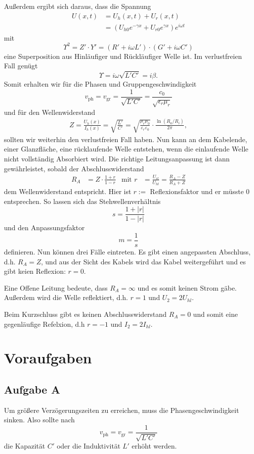 \documentclass[10pt]{article}
\begin{document}
\begin{multicols}{2}
	Außerdem ergibt sich daraus, dass die Spannung
	\begin{align*}
		U(x, t) & = U_h(x, t) + U_r(x, t)                                                  \\
		        & = \left(U_{h0} e^{-\gamma x} + U_{r0} e^{\gamma x}\right) e^{i \omega t}
	\end{align*}
	mit
	\[
		\Upsilon^2 = Z' \cdot Y' = \left(R' + i \omega L'\right) \cdot \left(G' + i \omega C'\right)
	\]
	eine Superposition aus Hinläufiger und Rückläufiger Welle ist. Im verlustfreien Fall genügt
	\[
		\Upsilon = i \omega \sqrt{L'C'} = i \beta.
	\]
	Somit erhalten wir für die Phasen und Gruppengeschwindigkeit
	\[
    v_{\text{ph}}=v_{\text{gr}}=\frac{1}{\sqrt{L'C'}}=\frac{c_0}{\sqrt{\epsilon_r\mu_r}}
	\]
	und für den Wellenwiderstand
	\begin{align*}
		Z = \frac{U_h(x)}{I_h(x)} =\sqrt{\frac{L'}{C'}}=\sqrt{\frac{\mu_r \mu_0}{\varepsilon_r \varepsilon_0}} \cdot \frac{\ln\left(R_a/R_i\right)}{2\pi}
,
	\end{align*}
	sollten wir weiterhin den verlustfreien Fall haben.
	Nun kann an dem Kabelende, einer Glanzfläche, eine rücklaufende Welle entstehen, wenn die einlaufende Welle nicht vollständig Absorbiert wird. Die richtige Leitungsanpassung ist dann gewährleistet, sobald der Abschlusswiderstand
	\begin{align*}
		R_A & = Z\cdot\frac{1+r}{1-r} & \text{mit } r & =\frac{U_{rl}}{U_{hl}} = \frac{R_A-Z}{R_A+Z}
	\end{align*}
	dem Wellenwiderstand entspricht. Hier ist \(r:=\) Reflexionsfaktor und er müsste 0 entsprechen. So lassen sich das Stehwellenverhältnis
	\[
		s = \frac{1 + |r|}{1-|r|}
	\]
	und den Anpassungsfaktor
	\[
		m = \frac{1}{s}
	\]
	definieren.
	Nun können drei Fälle eintreten. Es gibt einen angepassten Abschluss, d.h. \(R_A=Z\), und aus der Sicht des Kabels wird das Kabel weitergeführt und es gibt keien Reflexion: \(r=0\).

	Eine Offene Leitung bedeute, dass \(R_A=\infty\) und es somit keinen Strom gäbe. Außerdem wird die Welle reflektiert, d.h. \(r=1\) und \(U_2 = 2U_{hl}\).

	Beim Kurzschluss gibt es keinen Abschlusswiderstand \(R_A=0\) und somit eine gegenläufige Refelxion, d.h \(r=-1\) und $I_2=2I_{hl}$.

	\section{\large Voraufgaben}
	\subsection{Aufgabe A}
	Um größere Verzögerungszeiten zu erreichen, muss die Phasengeschwindigkeit sinken. Also sollte nach \[
		v_{\text{ph}}=v_{\text{gr}}=\frac{1}{\sqrt{L'C'}}
	\]die Kapazität $C'$ oder die Induktivität $L'$ erhöht werden.

\end{multicols}
\end{document}
